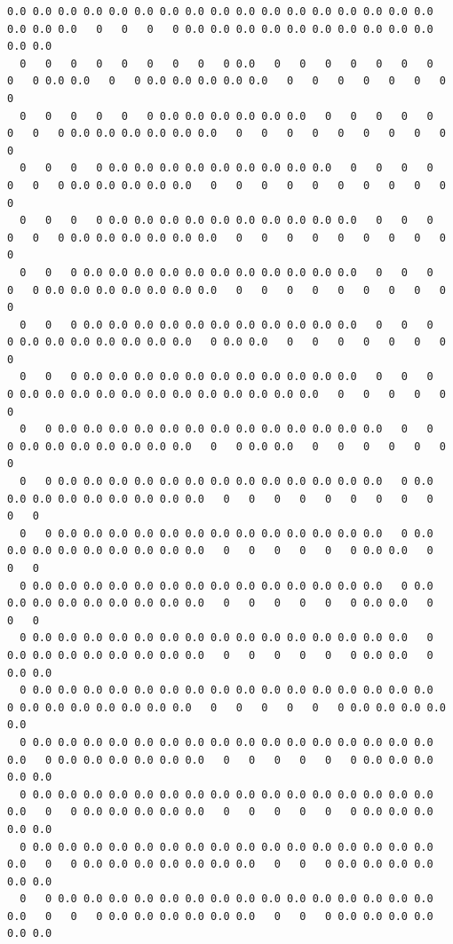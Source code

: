 \documentclass[11pt,fleqn]{book} %
\begin{document}
\tiny\begin{verbatim}
0.0 0.0 0.0 0.0 0.0 0.0 0.0 0.0 0.0 0.0 0.0 0.0 0.0 0.0 0.0 0.0 0.0 0.0 0.0 0.0   0   0   0   0 0.0 0.0 0.0 0.0 0.0 0.0 0.0 0.0 0.0 0.0 0.0 0.0
  0   0   0   0   0   0   0   0   0 0.0   0   0   0   0   0   0   0   0   0 0.0 0.0   0   0 0.0 0.0 0.0 0.0 0.0   0   0   0   0   0   0   0   0
  0   0   0   0   0   0 0.0 0.0 0.0 0.0 0.0 0.0   0   0   0   0   0   0   0   0 0.0 0.0 0.0 0.0 0.0 0.0   0   0   0   0   0   0   0   0   0   0
  0   0   0   0 0.0 0.0 0.0 0.0 0.0 0.0 0.0 0.0 0.0   0   0   0   0   0   0   0 0.0 0.0 0.0 0.0 0.0   0   0   0   0   0   0   0   0   0   0   0
  0   0   0   0 0.0 0.0 0.0 0.0 0.0 0.0 0.0 0.0 0.0 0.0   0   0   0   0   0   0 0.0 0.0 0.0 0.0 0.0 0.0   0   0   0   0   0   0   0   0   0   0
  0   0   0 0.0 0.0 0.0 0.0 0.0 0.0 0.0 0.0 0.0 0.0 0.0   0   0   0   0   0 0.0 0.0 0.0 0.0 0.0 0.0 0.0   0   0   0   0   0   0   0   0   0   0
  0   0   0 0.0 0.0 0.0 0.0 0.0 0.0 0.0 0.0 0.0 0.0 0.0   0   0   0   0 0.0 0.0 0.0 0.0 0.0 0.0 0.0   0 0.0 0.0   0   0   0   0   0   0   0   0
  0   0   0 0.0 0.0 0.0 0.0 0.0 0.0 0.0 0.0 0.0 0.0 0.0   0   0   0   0 0.0 0.0 0.0 0.0 0.0 0.0 0.0 0.0 0.0 0.0 0.0 0.0   0   0   0   0   0   0
  0   0 0.0 0.0 0.0 0.0 0.0 0.0 0.0 0.0 0.0 0.0 0.0 0.0 0.0   0   0   0 0.0 0.0 0.0 0.0 0.0 0.0 0.0   0   0 0.0 0.0   0   0   0   0   0   0   0
  0   0 0.0 0.0 0.0 0.0 0.0 0.0 0.0 0.0 0.0 0.0 0.0 0.0 0.0   0 0.0 0.0 0.0 0.0 0.0 0.0 0.0 0.0 0.0   0   0   0   0   0   0   0   0   0   0   0
  0   0 0.0 0.0 0.0 0.0 0.0 0.0 0.0 0.0 0.0 0.0 0.0 0.0 0.0   0 0.0 0.0 0.0 0.0 0.0 0.0 0.0 0.0 0.0   0   0   0   0   0   0 0.0 0.0   0   0   0
  0 0.0 0.0 0.0 0.0 0.0 0.0 0.0 0.0 0.0 0.0 0.0 0.0 0.0 0.0   0 0.0 0.0 0.0 0.0 0.0 0.0 0.0 0.0 0.0   0   0   0   0   0   0 0.0 0.0   0   0   0
  0 0.0 0.0 0.0 0.0 0.0 0.0 0.0 0.0 0.0 0.0 0.0 0.0 0.0 0.0 0.0   0 0.0 0.0 0.0 0.0 0.0 0.0 0.0 0.0   0   0   0   0   0   0 0.0 0.0   0 0.0 0.0
  0 0.0 0.0 0.0 0.0 0.0 0.0 0.0 0.0 0.0 0.0 0.0 0.0 0.0 0.0 0.0 0.0   0 0.0 0.0 0.0 0.0 0.0 0.0 0.0   0   0   0   0   0   0 0.0 0.0 0.0 0.0 0.0
  0 0.0 0.0 0.0 0.0 0.0 0.0 0.0 0.0 0.0 0.0 0.0 0.0 0.0 0.0 0.0 0.0 0.0   0 0.0 0.0 0.0 0.0 0.0 0.0   0   0   0   0   0   0 0.0 0.0 0.0 0.0 0.0
  0 0.0 0.0 0.0 0.0 0.0 0.0 0.0 0.0 0.0 0.0 0.0 0.0 0.0 0.0 0.0 0.0 0.0   0   0 0.0 0.0 0.0 0.0 0.0   0   0   0   0   0   0 0.0 0.0 0.0 0.0 0.0
  0 0.0 0.0 0.0 0.0 0.0 0.0 0.0 0.0 0.0 0.0 0.0 0.0 0.0 0.0 0.0 0.0 0.0   0   0 0.0 0.0 0.0 0.0 0.0 0.0 0.0   0   0   0 0.0 0.0 0.0 0.0 0.0 0.0
  0   0 0.0 0.0 0.0 0.0 0.0 0.0 0.0 0.0 0.0 0.0 0.0 0.0 0.0 0.0 0.0 0.0   0   0   0 0.0 0.0 0.0 0.0 0.0 0.0   0   0   0 0.0 0.0 0.0 0.0 0.0 0.0

\end{verbatim}
\end{document}

